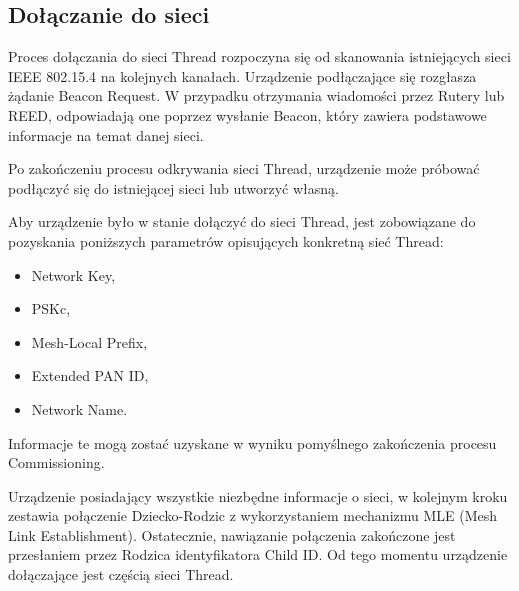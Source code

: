     \subsection{Dołączanie do sieci}

    Proces dołączania do sieci Thread rozpoczyna się od skanowania istniejących sieci IEEE 802.15.4 na kolejnych kanałach. Urządzenie podłączające się rozgłasza żądanie Beacon Request. W przypadku otrzymania wiadomości przez Rutery lub REED, odpowiadają one poprzez wysłanie Beacon, który zawiera podstawowe informacje na temat danej sieci.

    Po zakończeniu procesu odkrywania sieci Thread, urządzenie może próbować podłączyć się do istniejącej sieci lub utworzyć własną.

    Aby urządzenie było w stanie dołączyć do sieci Thread, jest zobowiązane do pozyskania poniższych parametrów opisujących konkretną sieć Thread:
    \begin{itemize}
        \item Network Key,
        \item PSKc,
        \item Mesh-Local Prefix,
        \item Extended PAN ID,
        \item Network Name.
    \end{itemize}
    
    Informacje te mogą zostać uzyskane w wyniku pomyślnego zakończenia procesu Commissioning.

    Urządzenie posiadający wszystkie niezbędne informacje o sieci, w kolejnym kroku zestawia połączenie Dziecko-Rodzic z wykorzystaniem mechanizmu MLE (Mesh Link Establishment). Ostatecznie, nawiązanie połączenia zakończone jest przesłaniem przez Rodzica identyfikatora Child ID. Od tego momentu urządzenie dołączające jest częścią sieci Thread.
















